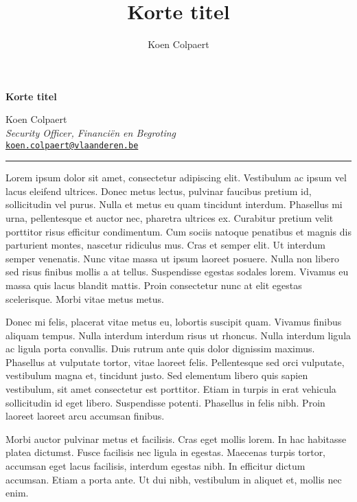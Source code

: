 \documentclass[11pt,]{article}
\title{Korte titel}
\author{Koen Colpaert}
\date{}
\newcommand{\blankline}{\quad\pagebreak[2]}
\begin{document}
  



\thispagestyle{plain} 

\begin{flushleft}\Large \bf Korte titel  \end{flushleft}
	\vspace{1 mm}   
Koen Colpaert \\
\emph{Security Officer, Financiën en Begroting} \\
\texttt{\href{mailto:koen.colpaert@vlaanderen.be}{\nolinkurl{koen.colpaert@vlaanderen.be}}}   \\

  

\hrule

\vspace{6 mm}
	


Lorem ipsum dolor sit amet, consectetur adipiscing elit. Vestibulum ac
ipsum vel lacus eleifend ultrices. Donec metus lectus, pulvinar faucibus
pretium id, sollicitudin vel purus. Nulla et metus eu quam tincidunt
interdum. Phasellus mi urna, pellentesque et auctor nec, pharetra
ultrices ex. Curabitur pretium velit porttitor risus efficitur
condimentum. Cum sociis natoque penatibus et magnis dis parturient
montes, nascetur ridiculus mus. Cras et semper elit. Ut interdum semper
venenatis. Nunc vitae massa ut ipsum laoreet posuere. Nulla non libero
sed risus finibus mollis a at tellus. Suspendisse egestas sodales lorem.
Vivamus eu massa quis lacus blandit mattis. Proin consectetur nunc at
elit egestas scelerisque. Morbi vitae metus metus.

Donec mi felis, placerat vitae metus eu, lobortis suscipit quam. Vivamus
finibus aliquam tempus. Nulla interdum interdum risus ut rhoncus. Nulla
interdum ligula ac ligula porta convallis. Duis rutrum ante quis dolor
dignissim maximus. Phasellus at vulputate tortor, vitae laoreet felis.
Pellentesque sed orci vulputate, vestibulum magna et, tincidunt justo.
Sed elementum libero quis sapien vestibulum, sit amet consectetur est
porttitor. Etiam in turpis in erat vehicula sollicitudin id eget libero.
Suspendisse potenti. Phasellus in felis nibh. Proin laoreet laoreet arcu
accumsan finibus.

Morbi auctor pulvinar metus et facilisis. Cras eget mollis lorem. In hac
habitasse platea dictumst. Fusce facilisis nec ligula in egestas.
Maecenas turpis tortor, accumsan eget lacus facilisis, interdum egestas
nibh. In efficitur dictum accumsan. Etiam a porta ante. Ut dui nibh,
vestibulum in aliquet et, mollis nec enim.
\end{document}
